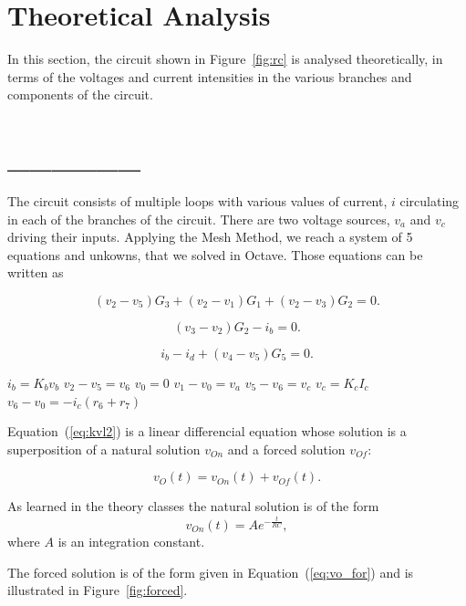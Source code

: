 \section{Theoretical Analysis}
\label{sec:analysis}

In this section, the circuit shown in Figure~\ref{fig:rc} is analysed
theoretically, in terms of the voltages and current intensities in the various branches and components of the circuit.

\section{______}

The circuit consists of multiple loops with various values of current, $i$ circulating in each of the branches of the circuit. There are two
voltage sources, $v_a$ and $v_c$ driving their inputs. Applying the Mesh Method, we reach a system of 5 equations and unkowns, that we solved in Octave. Those equations can be written as

\begin{equation}
  (v_2 - v_5)G_3 + (v_2 - v_1)G_1 + (v_2 - v_3)G_2 = 0.
  \label{eq:kvl}
\end{equation}

\begin{equation}
  (v_3 - v_2)G_2 - i_b = 0.
\end{equation}

\begin{equation}
  i_b - i_d + (v_4 - v_5)G_5 = 0.
  \label{eq:kvl2}
\end{equation}

$i_b = K_b v_b$
$v_2 -v_5 = v_6$
$v_0 = 0$
$v_1 - v_0 = v_a$
$v_5 - v_6 = v_c$
$v_c = K_c I_c$
$v_6 - v_0 = -i_c(r_6 + r_7)$

Equation~(\ref{eq:kvl2}) is a linear differencial equation whose solution is a
superposition of a natural solution $v_{On}$ and a forced solution $v_{Of}$:

\begin{equation}
  v_O(t) = v_{On}(t) + v_{Of}(t).
  \label{eq:vo_sol}
\end{equation}

As learned in the theory classes the natural solution is of the form
\begin{equation}
  v_{On}(t) = Ae^{-\frac{t}{RC}},
  \label{eq:vo_nat}
\end{equation}
where $A$ is an integration constant.

The forced solution is of the form given in Equation~(\ref{eq:vo_for}) and is
illustrated in Figure~\ref{fig:forced}.


